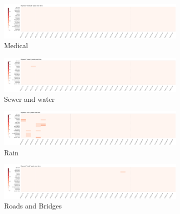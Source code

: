 \begin{figure}[!h]
    \centering
    \begin{subfigure}[!h]{0.24\textwidth}
        \centering
        \includegraphics[width=1.00\textwidth]{figs/q1/cond_30h/cond_30h_medical.png}
        \caption{Medical}
        \label{fig:medical_30h}
    \end{subfigure}
    \begin{subfigure}[!h]{0.24\textwidth}
        \centering
        \includegraphics[width=1.00\textwidth]{figs/q1/cond_30h/cond_30h_sewer.png}
        \caption{Sewer and water}
        \label{fig:sewer_30h}
    \end{subfigure}
    \begin{subfigure}[!h]{0.24\textwidth}
        \centering
        \includegraphics[width=1.00\textwidth]{figs/q1/cond_30h/cond_30h_rain.png}
        \caption{Rain}
        \label{fig:rain_30h}
    \end{subfigure}
    \begin{subfigure}[!h]{0.24\textwidth}
        \centering
        \includegraphics[width=1.00\textwidth]{figs/q1/cond_30h/cond_30h_road.png}
        \caption{Roads and Bridges}
        \label{fig:roads_30h}
    \end{subfigure}
    \begin{subfigure}[!h]{0.98\textwidth}

\end{subfigure}
\end{figure}

